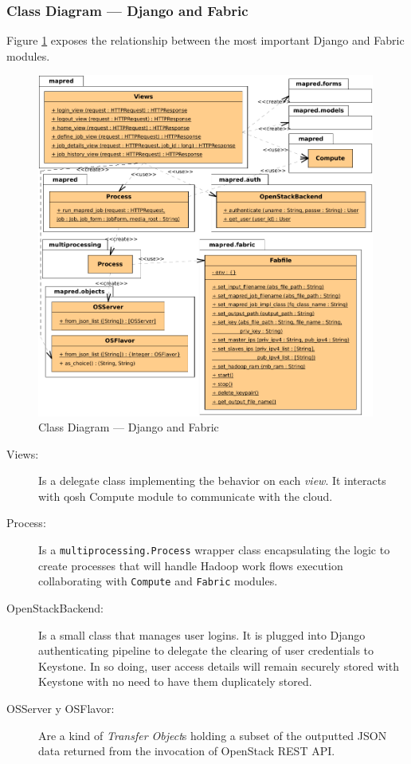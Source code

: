 \subsubsection{Class Diagram --- Django and Fabric}\label{subsubsec:clasesdjangofabric}
\noindent Figure \ref{fig:djangoyfabric} exposes the relationship between the most important Django and Fabric modules.

\begin{figure}[tbp]
\begin{center}
\includegraphics[width=0.99\textwidth]{imagenes/029.pdf}
 \caption{Class Diagram --- Django and Fabric}
\label{fig:djangoyfabric}
\end{center}
\end{figure}

\begin{description}
 \item[Views:] Is a delegate class implementing the behavior on each \emph{view}. It interacts with qosh Compute module to communicate with the cloud.
 \item[Process:] Is a \texttt{multiprocessing.Process} wrapper class encapsulating the logic to create processes that will handle Hadoop work flows execution collaborating with \texttt{Compute} and \texttt{Fabric} modules.
 \item[OpenStackBackend:] Is a small class that manages user logins. It is plugged into Django authenticating pipeline to delegate the clearing of user credentials to Keystone. In so doing, user access details will remain securely stored with Keystone with no need to have them duplicately stored.
 \item[OSServer y OSFlavor:] Are a kind of \emph{Transfer Object}s holding a subset of the outputted JSON data returned from the invocation of OpenStack REST API.
\end{description}

